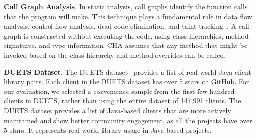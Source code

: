 \textbf{Call Graph Analysis}. In static analysis, call graphs identify the function calls that the
program will make. This technique plays a fundamental role in data flow analysis, control flow analysis,
dead code elimination, and taint tracking~\cite{Keshani2024}. A call graph is constructed without
executing the code, using class hierarchies, method signatures, and type information. CHA assumes
that any method that might be invoked based on the class hierarchy and method overrides can be called.

\textbf{DUETS Dataset}. The DUETS dataset~\cite{durieux21:_duets} provides a list of real-world Java
client-library pairs. Each client in the DUETS dataset has over 5 stars on GitHub. For our evaluation,
we selected a convenience sample from the first few hundred clients in DUETS, rather than using the
entire dataset of 147,991 clients. The DUETS dataset provides a list of Java-based clients that are
more actively maintained and show better community engagement, as all the projects have over 5 stars.
It represents real-world library usage in Java-based projects.